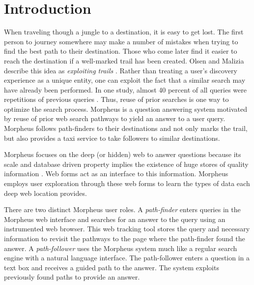 \section{Introduction}



When traveling though a jungle to a destination, it is easy to get lost.  The first person to journey somewhere may make a number of mistakes when trying to find the best path to their destination. Those who come later find it easier to reach the destination if a well-marked trail has been created. Olsen and Malizia describe this idea as \emph{exploiting trails} \cite{5379671}.  Rather than treating a user's discovery experience as a unique entity, one can exploit the fact that a similar search may have already been performed.  In one study, almost 40 percent of all queries were repetitions of previous queries \cite{1277770}. Thus, reuse of prior searches is one way to optimize the search
process.  Morpheus is a question answering system motivated by reuse of prior web search pathways to yield an answer to a user query. Morpheus follows path-finders to their destinations and not only marks the trail, but also provides a taxi service to take followers to similar destinations.  

Morpheus focuses on the deep (or hidden) web to answer questions because its scale and database driven property implies the existence of huge stores of quality information \cite{1453931}.  Web forms act as an interface to this information.  Morpheus employs user exploration through these web forms to learn the types of data each deep web location provides.

There are two distinct Morpheus user roles. A \textit{path-finder} enters queries in the Morpheus web interface and searches for an answer to the query using an instrumented web browser. This web tracking tool stores the query and necessary information to revisit the pathways to the page where the path-finder found the answer. A \textit{path-follower} uses the Morpheus system much like a regular search engine with a natural language interface. The path-follower enters a question in a text box and receives a guided path to the answer. The system exploits previously found paths to provide an answer.

